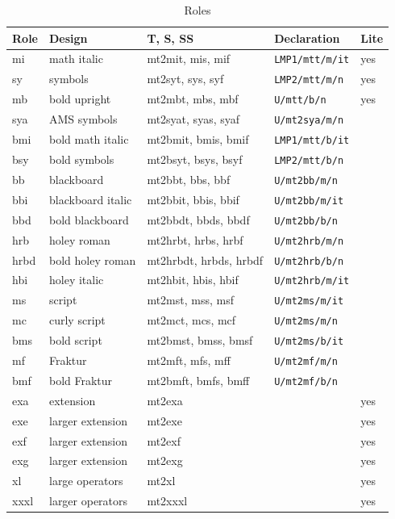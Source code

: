 \documentclass[10pt]{article}
\newcommand\code[1]{\texttt{#1}}
\begin{document}
\begin{table}[htbp]
\centering
\caption{Roles}\label{tab:roles}
\begin{tabular}{lllll}
\toprule
Role & Design & T, S, SS & Declaration & Lite \\
\midrule
mi & math italic & mt2mit, mis, mif & \code{LMP1/mtt/m/it} & yes \\
sy & symbols & mt2syt, sys, syf & \code{LMP2/mtt/m/n} & yes \\
mb & bold upright & mt2mbt, mbs, mbf & \code{U/mtt/b/n} & yes \\
sya & AMS symbols & mt2syat, syas, syaf & \code{U/mt2sya/m/n} & \\
bmi & bold math italic & mt2bmit, bmis, bmif & \code{LMP1/mtt/b/it} & \\
bsy & bold symbols & mt2bsyt, bsys, bsyf & \code{LMP2/mtt/b/n} & \\
bb & blackboard & mt2bbt, bbs, bbf & \code{U/mt2bb/m/n} & \\
bbi & blackboard italic & mt2bbit, bbis, bbif & \code{U/mt2bb/m/it} & \\
bbd & bold blackboard & mt2bbdt, bbds, bbdf & \code{U/mt2bb/b/n} & \\
hrb & holey roman & mt2hrbt, hrbs, hrbf & \code{U/mt2hrb/m/n} & \\
hrbd & bold holey roman & mt2hrbdt, hrbds, hrbdf & \code{U/mt2hrb/b/n} & \\
hbi & holey italic & mt2hbit, hbis, hbif & \code{U/mt2hrb/m/it} & \\
ms & script & mt2mst, mss, msf & \code{U/mt2ms/m/it} & \\
mc & curly script & mt2mct, mcs, mcf & \code{U/mt2ms/m/n} & \\
bms & bold script & mt2bmst, bmss, bmsf & \code{U/mt2ms/b/it} & \\
mf & Fraktur & mt2mft, mfs, mff & \code{U/mt2mf/m/n} & \\
bmf & bold Fraktur & mt2bmft, bmfs, bmff & \code{U/mt2mf/b/n} & \\
exa & extension & mt2exa & \code{\string\MTEXA@} & yes \\
exe & larger extension & mt2exe & \code{\string\MTEXE@} & yes \\
exf & larger extension & mt2exf & \code{\string\MTEXF@} & yes \\
exg & larger extension & mt2exg & \code{\string\MTEXG@} & yes \\
xl & large operators & mt2xl & \code{\string\MTXL@} & yes \\
xxxl & larger operators & mt2xxxl & \code{\string\MTXXXL@} & yes \\
\bottomrule
\end{tabular}
\end{table}
\end{document}
